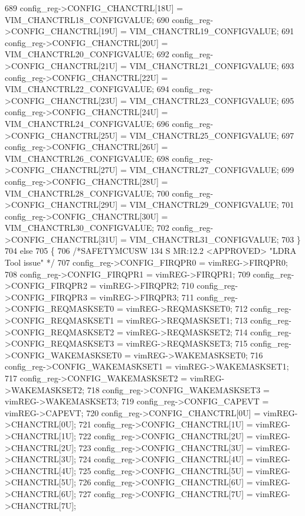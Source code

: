 \begin{DoxyCode}
689         config\_reg->CONFIG\_CHANCTRL[18U] = VIM\_CHANCTRL18\_CONFIGVALUE;
690         config\_reg->CONFIG\_CHANCTRL[19U] = VIM\_CHANCTRL19\_CONFIGVALUE;
691         config\_reg->CONFIG\_CHANCTRL[20U] = VIM\_CHANCTRL20\_CONFIGVALUE;
692         config\_reg->CONFIG\_CHANCTRL[21U] = VIM\_CHANCTRL21\_CONFIGVALUE;
693         config\_reg->CONFIG\_CHANCTRL[22U] = VIM\_CHANCTRL22\_CONFIGVALUE;
694         config\_reg->CONFIG\_CHANCTRL[23U] = VIM\_CHANCTRL23\_CONFIGVALUE;
695         config\_reg->CONFIG\_CHANCTRL[24U] = VIM\_CHANCTRL24\_CONFIGVALUE;
696         config\_reg->CONFIG\_CHANCTRL[25U] = VIM\_CHANCTRL25\_CONFIGVALUE;
697         config\_reg->CONFIG\_CHANCTRL[26U] = VIM\_CHANCTRL26\_CONFIGVALUE;
698         config\_reg->CONFIG\_CHANCTRL[27U] = VIM\_CHANCTRL27\_CONFIGVALUE;
699         config\_reg->CONFIG\_CHANCTRL[28U] = VIM\_CHANCTRL28\_CONFIGVALUE;
700         config\_reg->CONFIG\_CHANCTRL[29U] = VIM\_CHANCTRL29\_CONFIGVALUE;
701         config\_reg->CONFIG\_CHANCTRL[30U] = VIM\_CHANCTRL30\_CONFIGVALUE;
702         config\_reg->CONFIG\_CHANCTRL[31U] = VIM\_CHANCTRL31\_CONFIGVALUE;
703     \}
704     \textcolor{keywordflow}{else}
705     \{
706     \textcolor{comment}{/*SAFETYMCUSW 134 S MR:12.2 <APPROVED> "LDRA Tool issue" */}
707         config\_reg->CONFIG\_FIRQPR0 = vimREG->FIRQPR0;
708         config\_reg->CONFIG\_FIRQPR1 = vimREG->FIRQPR1;
709         config\_reg->CONFIG\_FIRQPR2 = vimREG->FIRQPR2;
710         config\_reg->CONFIG\_FIRQPR3 = vimREG->FIRQPR3;
711         config\_reg->CONFIG\_REQMASKSET0 = vimREG->REQMASKSET0;
712         config\_reg->CONFIG\_REQMASKSET1 = vimREG->REQMASKSET1;
713         config\_reg->CONFIG\_REQMASKSET2 = vimREG->REQMASKSET2;
714         config\_reg->CONFIG\_REQMASKSET3 = vimREG->REQMASKSET3;
715         config\_reg->CONFIG\_WAKEMASKSET0 = vimREG->WAKEMASKSET0;
716         config\_reg->CONFIG\_WAKEMASKSET1 = vimREG->WAKEMASKSET1;
717         config\_reg->CONFIG\_WAKEMASKSET2 = vimREG->WAKEMASKSET2;
718         config\_reg->CONFIG\_WAKEMASKSET3 = vimREG->WAKEMASKSET3;
719         config\_reg->CONFIG\_CAPEVT = vimREG->CAPEVT;
720         config\_reg->CONFIG\_CHANCTRL[0U] = vimREG->CHANCTRL[0U];
721         config\_reg->CONFIG\_CHANCTRL[1U] = vimREG->CHANCTRL[1U];
722         config\_reg->CONFIG\_CHANCTRL[2U] = vimREG->CHANCTRL[2U];
723         config\_reg->CONFIG\_CHANCTRL[3U] = vimREG->CHANCTRL[3U];
724         config\_reg->CONFIG\_CHANCTRL[4U] = vimREG->CHANCTRL[4U];
725         config\_reg->CONFIG\_CHANCTRL[5U] = vimREG->CHANCTRL[5U];
726         config\_reg->CONFIG\_CHANCTRL[6U] = vimREG->CHANCTRL[6U];
727         config\_reg->CONFIG\_CHANCTRL[7U] = vimREG->CHANCTRL[7U];

\end{DoxyCode}
